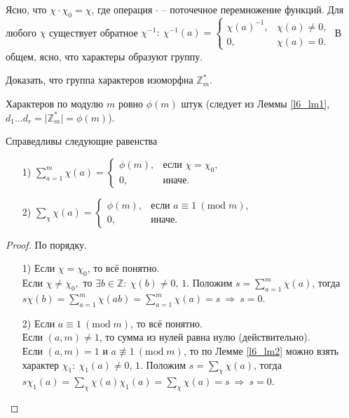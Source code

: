 Ясно, что $\chi \cdot \chi_0 = \chi$, где операция $\cdot$ -- поточечное перемножение функций. Для любого $\chi$ существует обратное $\chi^{-1}: \ \chi^{-1}(a) = \begin{cases} 
	\chi(a)^{-1}, & \chi(a) \ne 0, \\ 
	0, & \chi(a) = 0. 
\end{cases}$ В общем, ясно, что характеры образуют группу.

\begin{problem} \label{l6_task}
	Доказать, что группа характеров изоморфна $\mathbb{Z}_m^\ast$.
\end{problem}

Характеров по модулю $m$ ровно $\phi(m)$ штук (следует из Леммы \ref{l6_lm1}, $d_1 \dots d_r = \lvert \mathbb{Z}_m^\ast \rvert = \phi(m)$).

\begin{lemma} \label{l6_lm3}
	Справедливы следующие равенства
	\begin{enumerate}
		\item[1)] $\displaystyle \sum\limits_{a=1}^m \chi(a) = 
			\begin{cases} 
				\phi(m), & \text{если } \chi=\chi_0, \\ 
				0, & \text{иначе.} 
			\end{cases}$
		\item[2)] $\displaystyle \sum\limits_\chi \chi(a) = 
		\begin{cases} 
			\phi(m), & \text{если } a \equiv 1 \ (\mathrm{mod} \; m), \\ 
			0, & \text{иначе.} 
		\end{cases}$
	\end{enumerate}
\end{lemma}
\begin{proof}
	По порядку.
	\begin{enumerate}
		\item[1)] Если $\chi = \chi_0$, то всё понятно.\\
			Если $\chi \ne \chi_0,$ то $\exists b \in \mathbb{Z}: \ \chi(b) \ne 0, \, 1$. Положим $\displaystyle s = \sum\limits_{a=1}^m \chi(a)$, тогда $\displaystyle s \chi(b) = \sum\limits_{a=1}^m \chi(ab) = \sum\limits_{a=1}^m \chi(a) = s \ \Rightarrow \ s = 0$.
		\item[2)] Если $a \equiv 1 \ (\mathrm{mod} \; m)$, то всё понятно.\\
			Если $(a,m) \ne 1$, то сумма из нулей равна нулю (действительно).\\
			Если $(a,m) = 1$ и $a \not\equiv 1 \ (\mathrm{mod} \; m)$, то по Лемме \ref{l6_lm2} можно взять характер $\chi_1: \ \chi_1(a) \ne 0, \, 1.$ 
			Положим $\displaystyle s = \sum\limits_\chi \chi(a)$, тогда $s \chi_1(a) = \sum\limits_\chi \chi(a)\chi_1(a) = \sum\limits_\chi \chi(a) = s \ \Rightarrow \ s = 0$.
	\end{enumerate}
\end{proof}

